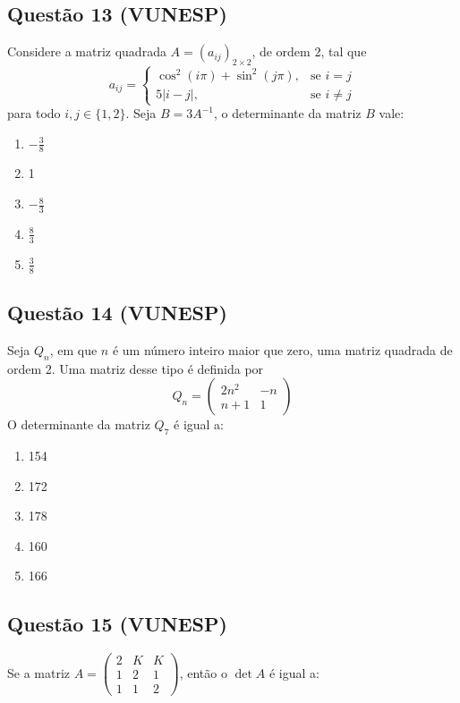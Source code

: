 \documentclass{article}
\begin{document}
\begin{multicols}{2}
		\subsection*{Questão 13 (VUNESP)}
		Considere a matriz quadrada \( A = (a_{ij})_{2 \times 2} \), de ordem 2, tal que  
		\[
		a_{ij} = \begin{cases} 
			\cos^2 (i\pi) + \sin^2 (j\pi), & \text{se } i = j \\
			5|i - j|, & \text{se } i \neq j
		\end{cases}
		\]
		para todo \( i, j \in \{1, 2\} \). Seja \( B = 3A^{-1} \), o determinante da matriz \( B \) vale:
		
		\begin{enumerate}[label=(\Alph*), noitemsep]
			\item \(-\frac{3}{8}\)
			\item 1
			\item \(-\frac{8}{3}\)
			\item \(\frac{8}{3}\)
			\item \(\frac{3}{8}\)
		\end{enumerate}
		
		\subsection*{Questão 14 (VUNESP)}
		Seja \( Q_n \), em que \( n \) é um número inteiro maior que zero, uma matriz quadrada de ordem 2. Uma matriz desse tipo é definida por  
		\[
		Q_n = \begin{pmatrix} 2n^2 & -n \\ n + 1 & 1 \end{pmatrix}
		\]
		O determinante da matriz \( Q_7 \) é igual a:
		
		\begin{enumerate}[label=(\Alph*), noitemsep]
			\item 154
			\item 172
			\item 178
			\item 160
			\item 166
		\end{enumerate}
		
		\subsection*{Questão 15 (VUNESP)}
		Se a matriz \( A = \begin{pmatrix} 2 & K & K \\ 1 & 2 & 1 \\ 1 & 1 & 2 \end{pmatrix} \), então o \(\det A\) é igual a:
		

\end{multicols}
\end{document}
